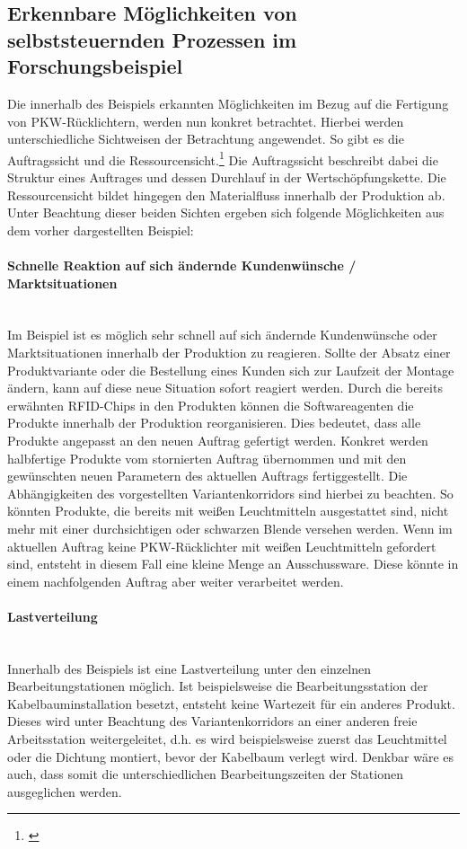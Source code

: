 \subsection{Erkennbare Möglichkeiten von selbststeuernden Prozessen im
Forschungsbeispiel}
\label{sec:Moeglichkeiten}

Die innerhalb des Beispiels erkannten Möglichkeiten im Bezug auf die Fertigung
von PKW-Rücklichtern, werden nun konkret betrachtet. Hierbei werden
unterschiedliche Sichtweisen der Betrachtung angewendet. So gibt es die
Auftragssicht und die Ressourcensicht.\footnote{\citet[S.~234]{arnold2008}}
Die Auftragssicht beschreibt dabei die Struktur eines Auftrages und dessen Durchlauf in der Wertschöpfungskette. Die
Ressourcensicht bildet hingegen den Materialfluss innerhalb der Produktion ab.
Unter Beachtung dieser beiden Sichten ergeben sich folgende Möglichkeiten aus
dem vorher dargestellten Beispiel:

\paragraph{Schnelle Reaktion auf sich ändernde Kundenwünsche /
Marktsituationen} \hfill \\
Im Beispiel ist es möglich sehr schnell auf sich ändernde Kundenwünsche oder
Marktsituationen innerhalb der Produktion zu reagieren. Sollte der Absatz einer
Produktvariante oder die Bestellung eines Kunden sich zur Laufzeit der Montage
ändern, kann auf diese neue Situation sofort reagiert werden. Durch die bereits
erwähnten RFID-Chips in den Produkten können die Softwareagenten die Produkte
innerhalb der Produktion reorganisieren. Dies bedeutet, dass alle Produkte
angepasst an den neuen Auftrag gefertigt werden. Konkret werden halbfertige
Produkte vom stornierten Auftrag übernommen und mit den gewünschten neuen
Parametern des aktuellen Auftrags fertiggestellt. Die Abhängigkeiten des
vorgestellten Variantenkorridors sind hierbei zu beachten. So könnten Produkte,
die bereits mit weißen Leuchtmitteln ausgestattet sind, nicht mehr mit einer
durchsichtigen oder schwarzen Blende versehen werden. Wenn im aktuellen Auftrag
keine PKW-Rücklichter mit weißen Leuchtmitteln gefordert sind, entsteht in
diesem Fall eine kleine Menge an Ausschussware. Diese könnte in einem
nachfolgenden Auftrag aber weiter verarbeitet werden.

\paragraph{Lastverteilung} \hfill \\
Innerhalb des Beispiels ist eine Lastverteilung unter den einzelnen
Bearbeitungstationen möglich. Ist beispielsweise die Bearbeitungsstation der
Kabelbauminstallation besetzt, entsteht keine Wartezeit für ein anderes Produkt.
Dieses wird unter Beachtung des Variantenkorridors an einer anderen freie
Arbeitsstation weitergeleitet, d.h. es wird beispielsweise zuerst das
Leuchtmittel oder die Dichtung montiert, bevor der Kabelbaum verlegt wird.
Denkbar wäre es auch, dass somit die unterschiedlichen Bearbeitungszeiten der
Stationen ausgeglichen werden.

